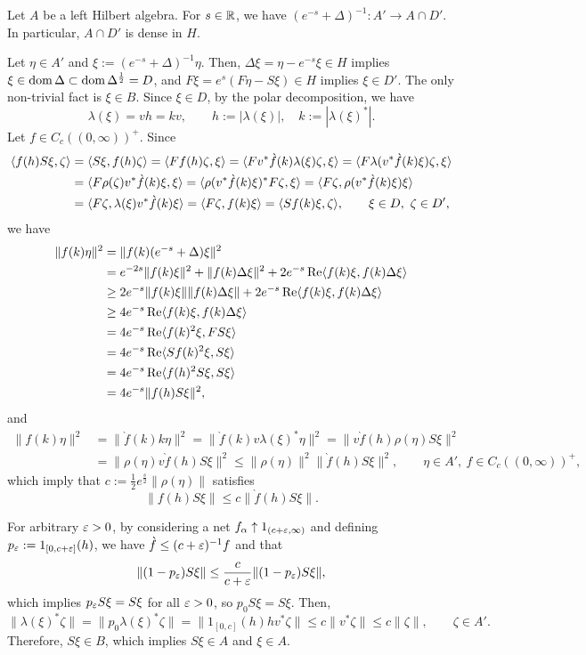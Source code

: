 \documentclass{../../small}
\begin{document}
\begin{lem}
Let $A$ be a left Hilbert algebra.
For $s\in\mathbb{R}$, we have $(e^{-s}+\Delta)^{-1}:A'\to A\cap D'$.
In particular, $A\cap D'$ is dense in $H$.
\end{lem}
\begin{pf}
Let $\eta\in A'$ and $\xi:=(e^{-s}+\Delta)^{-1}\eta$.
Then, $\Delta\xi=\eta-e^{-s}\xi\in H$ implies $\xi\in\operatorname{dom}\Delta\subset\operatorname{dom}\Delta^{\frac12}=D$, and $F\xi=e^s(F\eta-S\xi)\in H$ implies $\xi\in D'$.
The only non-trivial fact is $\xi\in B$.
Since $\xi\in D$, by the polar decomposition, we have
\[\lambda(\xi)=vh=kv,\qquad h:=|\lambda(\xi)|,\quad k:=|\lambda(\xi)^*|.\]
Let $f\in C_c((0,\infty))^+$.
Since
\begin{align*}
\langle f(h)S\xi,\zeta\rangle
&=\langle S\xi,f(h)\zeta\rangle
=\langle Ff(h)\zeta,\xi\rangle
=\langle Fv^*\grave f(k)\lambda(\xi)\zeta,\xi\rangle
=\langle F\lambda(v^*\grave f(k)\xi)\zeta,\xi\rangle\\
&=\langle F\rho(\zeta)v^*\grave f(k)\xi,\xi\rangle
=\langle\rho(v^*\grave f(k)\xi)^*F\zeta,\xi\rangle
=\langle F\zeta,\rho(v^*\grave f(k)\xi)\xi\rangle\\
&=\langle F\zeta,\lambda(\xi)v^*\grave f(k)\xi\rangle
=\langle F\zeta,f(k)\xi\rangle
=\langle Sf(k)\xi,\zeta\rangle,\qquad\xi\in D,\ \zeta\in D',
\end{align*}
we have
\begin{align*}
\|f(k)\eta\|^2
&=\|f(k)(e^{-s}+\Delta)\xi\|^2\\
&=e^{-2s}\|f(k)\xi\|^2+\|f(k)\Delta\xi\|^2+2e^{-s}\operatorname{Re}\langle f(k)\xi,f(k)\Delta\xi\rangle\\
&\ge2e^{-s}\|f(k)\xi\|\|f(k)\Delta\xi\|+2e^{-s}\operatorname{Re}\langle f(k)\xi,f(k)\Delta\xi\rangle\\
&\ge4e^{-s}\operatorname{Re}\langle f(k)\xi,f(k)\Delta\xi\rangle\\
&=4e^{-s}\operatorname{Re}\langle f(k)^2\xi,FS\xi\rangle\\
&=4e^{-s}\operatorname{Re}\langle Sf(k)^2\xi,S\xi\rangle\\
&=4e^{-s}\operatorname{Re}\langle f(h)^2S\xi,S\xi\rangle\\
&=4e^{-s}\|f(h)S\xi\|^2,
\end{align*}
and
\begin{align*}
\|f(k)\eta\|^2
&=\|\grave f(k)k\eta\|^2
=\|\grave f(k)v\lambda(\xi)^*\eta\|^2
=\|v\grave f(h)\rho(\eta)S\xi\|^2\\
&=\|\rho(\eta)v\grave f(h)S\xi\|^2
\le\|\rho(\eta)\|^2\|\grave f(h)S\xi\|^2,\qquad\eta\in A',\ f\in C_c((0,\infty))^+,
\end{align*}
which imply that $c:=\frac12e^{\frac s2}\|\rho(\eta)\|$ satisfies
\[\|f(h)S\xi\|\le c\|\grave f(h)S\xi\|.\]

For arbitrary $\varepsilon>0$, by considering a net $f_\alpha\uparrow1_{(c+\varepsilon,\infty)}$ and defining $p_\varepsilon:=1_{[0,c+\varepsilon]}(h)$, we have $\grave f\le(c+\varepsilon)^{-1}f$ and that
\[\|(1-p_\varepsilon)S\xi\|\le\frac c{c+\varepsilon}\|(1-p_\varepsilon)S\xi\|,\]
which implies $p_\varepsilon S\xi=S\xi$ for all $\varepsilon>0$, so $p_0S\xi=S\xi$.
Then,
\[\|\lambda(\xi)^*\zeta\|=\|p_0\lambda(\xi)^*\zeta\|=\|1_{[0,c]}(h)hv^*\zeta\|\le c\|v^*\zeta\|\le c\|\zeta\|,\qquad\zeta\in A'.\]
Therefore, $S\xi\in B$, which implies $S\xi\in A$ and $\xi\in A$.


\end{pf}
\end{document}
